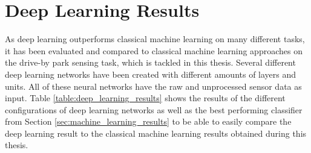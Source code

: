 




\section{Deep Learning Results}
\label{sec:deep_learning_results}

As deep learning outperforms classical machine learning on many different tasks, it has been evaluated and compared to classical machine learning approaches on the drive-by park sensing task, which is tackled in this thesis. Several different deep learning networks have been created with different amounts of layers and units. All of these neural networks have the raw and unprocessed sensor data as input. Table \ref{table:deep_learning_results} shows the results of the different configurations of deep learning networks as well as the best performing classifier from Section \ref{sec:machine_learning_results} to be able to easily compare the deep learning result to the classical machine learning results obtained during this thesis.



